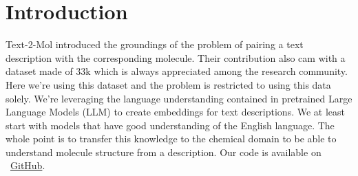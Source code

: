 \section{Introduction}
\label{sec:intro}
Text-2-Mol \cite{text2mol} introduced the groundings of the problem of pairing a text description with the corresponding molecule.
Their contribution also cam with a dataset made of 33k which is always appreciated among the research community.
Here we're using this dataset and the problem is restricted to using this data solely.
We're leveraging the language understanding contained in pretrained Large Language Models (LLM) to create embeddings for text descriptions.
We at least start with models that have good understanding of the English language. The whole point is to transfer this knowledge to the chemical domain to be able to understand molecule structure from a description.
Our code is available on ~\href{https://github.com/balthazarneveu/molecule-retrieval-u sing-nlp}{GitHub}.


